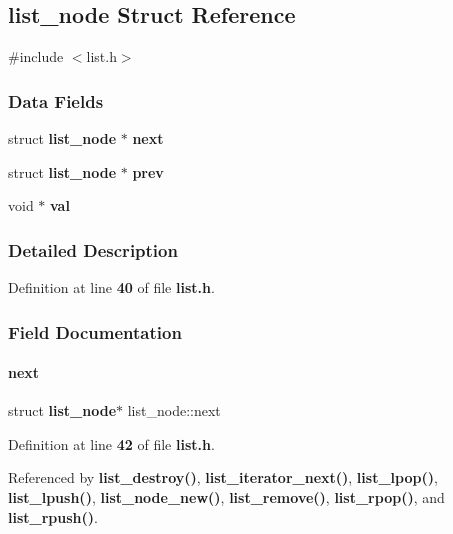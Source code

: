 \subsection{list\+\_\+node Struct Reference}
\label{structlist__node}


{\ttfamily \#include $<$list.\+h$>$}

\subsubsection*{Data Fields}
\begin{DoxyCompactItemize}
\item 
struct \textbf{ list\+\_\+node} $\ast$ \textbf{ next}
\item 
struct \textbf{ list\+\_\+node} $\ast$ \textbf{ prev}
\item 
void $\ast$ \textbf{ val}
\end{DoxyCompactItemize}


\subsubsection{Detailed Description}


Definition at line \textbf{ 40} of file \textbf{ list.\+h}.



\subsubsection{Field Documentation}
\mbox{\label{structlist__node_a0b99ca890dbfe832a8475f4bbd72338c}} 
\paragraph{next}
{\footnotesize\ttfamily struct \textbf{ list\+\_\+node}$\ast$ list\+\_\+node\+::next}



Definition at line \textbf{ 42} of file \textbf{ list.\+h}.



Referenced by \textbf{ list\+\_\+destroy()}, \textbf{ list\+\_\+iterator\+\_\+next()}, \textbf{ list\+\_\+lpop()}, \textbf{ list\+\_\+lpush()}, \textbf{ list\+\_\+node\+\_\+new()}, \textbf{ list\+\_\+remove()}, \textbf{ list\+\_\+rpop()}, and \textbf{ list\+\_\+rpush()}.

\mbox{\label{structlist__node_a30baba3b27442cbca9694076003ed65e}} 
